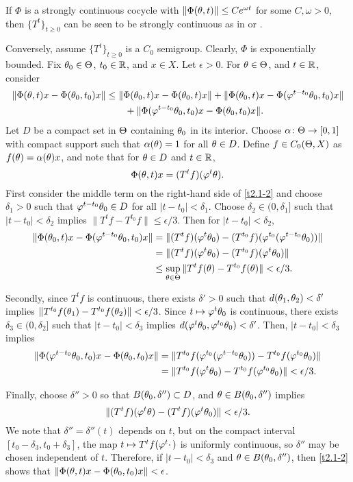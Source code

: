 \begin{pf}  If $\Phi$ is a strongly continuous cocycle with
$\|\Phi(\theta,t)\|\le C e^{\omega t}$ for some $C,\omega>0$,
then $\{T^t\}_{t\ge0}$ can be seen to be strongly continuous
as in \cite{LS} or \cite{Rau}.

Conversely, assume $\{T^t\}_{t\ge 0}$ is a $C_0$ semigroup.
Clearly, $\Phi$ is exponentially bounded.
Fix $\theta_0\in \Theta$, $t_0\in{\Bbb{R}}$, and $x\in X$.  Let $\epsilon>0$.
For $\theta\in \Theta$, and $t\in{\Bbb{R}}$, consider
\begin{equation}\lb{t2.1-2}
\begin{aligned}
\|\Phi(\th,t)x-\Phi(\th_0,t_0)x\|
&\le\|\Phi(\th_0,t)x-\Phi(\th_0,t)x\|
+\|\Phi(\th_0,t)x-\Phi(\vphi^{t-t_0}\th_0,t_0)x\|\\
&\qquad+\|\Phi(\vphi^{t-t_0}\th_0,t_0)x-\Phi(\th_0,t_0)x\|.
\end{aligned}
\end{equation}
Let $D$ be a compact set in $\Theta$ containing $\theta_0$ in its interior.
Choose $\alpha\colon \Theta\to[0,1]$ with compact support
such that $\alpha(\theta)=1$ for all $\theta\in D$.
Define $f\in C_0(\Theta,X)$ as $f(\theta)=\alpha(\theta)x$, and note that
for $\theta\in D$ and $t\in{\Bbb{R}}$,
$$
\Phi(\theta,t)x=(T^tf)(\varphi^t\theta).
$$
First consider the middle term on the right-hand side of
\eqref{t2.1-2} and choose $\delta_1>0$
such that $\varphi^{t-t_0}\theta_0\in D$
for all $|t-t_0|<\delta_1$.  Choose $\delta_2\in(0,\delta_1]$ such
that $|t-t_0|<\delta_2$ implies $\|T^tf-T^{t_0}f\|\le\epsilon/3$.
Then for $|t-t_0|<\delta_2$,
$$\begin{aligned}
\|\Phi(\theta_0,t)x-\Phi(\varphi^{t-t_0}\theta_0,t_0)x\|
&=\|(T^tf)(\varphi^t\theta_0)-(T^{t_0}f)(\varphi^{t_0}(\varphi^{t-t_0}\theta_0))\|\\
&=\|(T^tf)(\varphi^t\theta_0)-(T^{t_0}f)(\varphi^t\theta_0)\|\\
&\le\sup_{\theta\in \Theta}\|T^tf(\theta)-T^{t_0}f(\theta)\|<\epsilon/3.
\end{aligned}
$$

Secondly, since $T^tf$ is continuous, there exists $\delta'>0$ such
that $d(\theta_1,\theta_2)<\delta'$ implies
$\|T^{t_0}f(\theta_1)-T^{t_0}f(\theta_2)\|<\epsilon/3$.  Since $t\mapsto
\varphi^t\theta_0$ is continuous, there exists $\delta_3\in(0,\delta_2]$
such that $|t-t_0|<\delta_3$ implies
$d(\varphi^t\theta_0,\varphi^{t_0}\theta_0)<\delta'$.
Then, $|t-t_0|<\delta_3$ implies
$$\begin{aligned}
\|\Phi(\varphi^{t-t_0}\theta_0,t_0)x-\Phi(\theta_0,t_0)x\|
&=\|T^{t_0}f(\varphi^{t_0}(\varphi^{t-t_0}\theta_0))-T^{t_0}
  f(\varphi^{t_0}\theta_0)\|\\
&=\|T^{t_0}f(\varphi^t\theta_0)-T^{t_0}f(\varphi^{t_0}\theta_0)\|<\epsilon/3.
\end{aligned}$$

Finally, choose $\delta''>0$ so that $B(\theta_0,\delta'')\subset D$, and
$\theta\in B(\theta_0,\delta'')$ implies
\[ \|(T^tf)(\varphi^t\theta)-(T^tf)(\varphi^t\theta_0)\|<\epsilon/3.\]
We note that $\delta''=\delta''(t)$ depends on $t$, but on the
compact interval $[t_0-\delta_3,t_0+\delta_3]$, the map
$t\mapsto T^tf(\varphi^t\cdot\,)$ is
uniformly continuous, so $\delta''$ may be chosen independent of $t$.
Therefore, if
$|t-t_0|<\delta_3$ and $\theta\in B(\theta_0,\delta'')$, then \eqref{t2.1-2}
shows that $\|\Phi(\theta,t)x-\Phi(\theta_0,t_0)x\|<\epsilon$.
\end{pf}

